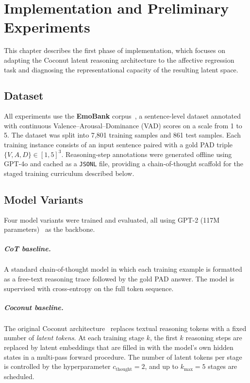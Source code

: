 \documentclass[12pt,twoside]{report}
\begin{document}
\chapter{Implementation and Preliminary Experiments}

This chapter describes the first phase of implementation, which focuses on adapting the Coconut latent reasoning architecture to the affective regression task and diagnosing the representational capacity of the resulting latent space.

\section{Dataset}

All experiments use the \textbf{EmoBank} corpus~\cite{buechel-hahn-2017-emobank}, a sentence-level dataset annotated with continuous Valence--Arousal--Dominance (VAD) scores on a scale from 1 to 5.
The dataset was split into 7{,}801 training samples and 861 test samples.
Each training instance consists of an input sentence paired with a gold PAD triple $\{V, A, D\} \in [1,5]^3$.
Reasoning-step annotations were generated offline using GPT-4o and cached as a \texttt{JSONL} file, providing a chain-of-thought scaffold for the staged training curriculum described below.

\section{Model Variants}

Four model variants were trained and evaluated, all using GPT-2 (117M parameters)~\cite{radford2019language} as the backbone.

\paragraph{CoT baseline.}
A standard chain-of-thought model in which each training example is formatted as a free-text reasoning trace followed by the gold PAD answer.
The model is supervised with cross-entropy on the full token sequence.

\paragraph{Coconut baseline.}
The original Coconut architecture~\cite{hao2025traininglargelanguagemodels} replaces textual reasoning tokens with a fixed number of \emph{latent tokens}.
At each training stage $k$, the first $k$ reasoning steps are replaced by latent embeddings that are filled in with the model's own hidden states in a multi-pass forward procedure.
The number of latent tokens per stage is controlled by the hyperparameter $c_{\text{thought}} = 2$, and up to $k_{\max} = 5$ stages are scheduled.
\end{document}
